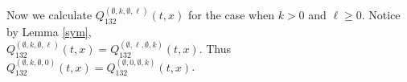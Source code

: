 \documentclass[
final,nomarks
]{dmtcs-episciences}
\newcommand{\Qmm}[1]{Q_{132}^{(#1)}(t,x)}
\begin{document}
Now we calculate \begin{math}\Qmm{\emptyset,k,\emptyset,\ell}\end{math} for the case when \begin{math}k > 0\end{math} and \begin{math}\ell \geq 0\end{math}. 
Notice by Lemma \ref{sym}, \\\begin{math}\Qmm{\emptyset,k,\emptyset,\ell} =\Qmm{\emptyset,\ell,\emptyset,k}\end{math}. 
Thus \begin{math}\Qmm{\emptyset,k,\emptyset,0} =\Qmm{\emptyset,0,\emptyset,k}\end{math}. 
\end{document}
